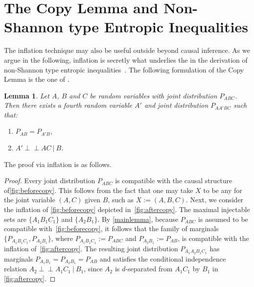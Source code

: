 \documentclass[aps,english,10pt,superscriptaddress,onecolumn,twoside,longbibliography,pra,floatfix,fleqn,nofootinbib]{revtex4-1}
\newcommand*{\tblue}[1]{{\color{MidnightBlue}{\textbf{#1}}}}
\newtheorem{lemma}[theorem]{Lemma}
\theoremstyle{definition}
\newcommand{\indep}{\perp\!\!\!\!\perp}
\begin{document}
\section{The Copy Lemma and Non-Shannon type Entropic Inequalities}\label{sec:NonShannon}

The inflation technique may also be useful outside beyond causal inference. As we argue in the following, inflation is secretly what underlies the \tblue{Copy Lemma} in the derivation of non-Shannon type entropic inequalities~\cite[Chapter~15]{yeung_network_2008}. The following formulation of the Copy Lemma is the one of \citet{kaced_equivalence_2013}.

\begin{lemma}
	Let $A$, $B$ and $C$ be random variables with joint distribution $P_{ABC}$. Then there exists a fourth random variable $A'$ and joint distribution $P_{AA'BC}$ such that:
	\begin{enumerate}
		\item $P_{AB} = P_{A'B}$,
		\item $A' \indep AC \:|\: B$.
	\label{copylemma}
	\end{enumerate}
\end{lemma}

The proof via inflation is as follows.

\begin{proof}
Every joint distribution $P_{ABC}$ is compatible with the causal structure of\cref{fig:beforecopy}.  This follows from the fact that one may take $X$ to be any \tblue{sufficient statistic} for the joint variable $(A,C)$ given $B$, such as $X := (A,B,C)$.  Next, we consider the inflation of \cref{fig:beforecopy} depicted in~\cref{fig:aftercopy}. The maximal injectable sets are $\{ A_1 B_1 C_1\}$ and $\{A_2 B_1\}$.  By \cref{mainlemma}, because $P_{ABC}$ is assumed to be compatible with~\cref{fig:beforecopy}, it follows that the family of marginals $\{ P_{A_1 B_1 C_1}, P_{A_2 B_1}\}$, where $P_{A_1 B_1 C_1}:= P_{A B C}$ and $P_{A_2 B_1} := P_{AB}$, is compatible with the inflation of~\cref{fig:aftercopy}. The resulting joint distribution $P_{A_1 A_2 B_1 C_1}$ has marginals $P_{A_1 B_1}= P_{A_2 B_1} =P_{AB}$ and satisfies the conditional independence relation $A_2 \indep A_1 C_1 \:|\: B_1$, since $A_2$ is $d$-separated from $A_1 C_1$ by $B_1$ in \cref{fig:aftercopy}.
\end{proof}
\end{document}

